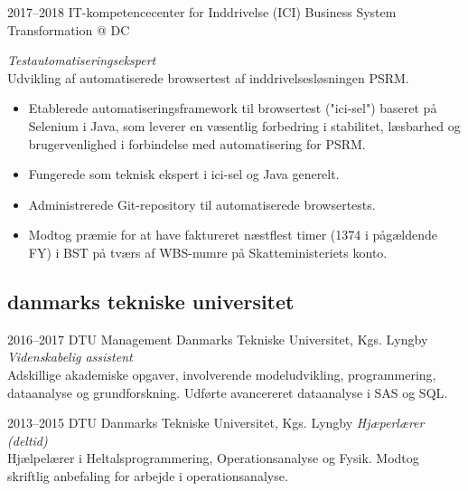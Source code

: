 \documentclass[]{../friggeri-cv} %
\begin{document}
\begin{entrylist}
\entry
{2017--2018}
{IT-kompetencecenter for Inddrivelse (ICI)}
{Business System Transformation @ DC}
{\emph{Testautomatiseringsekspert}\\
Udvikling af automatiserede browsertest af inddrivelsesløsningen PSRM. 
\begin{itemize}
\item Etablerede automatiseringsframework til browsertest ("ici-sel") baseret på Selenium i Java, som leverer en væsentlig forbedring i stabilitet, læsbarhed og brugervenlighed i forbindelse med automatisering for PSRM. 
\item Fungerede som teknisk ekspert i ici-sel og Java generelt. 
\item Administrerede Git-repository til automatiserede browsertests. 
\item Modtog præmie for at have faktureret næstflest timer (1374 i pågældende FY) i BST på tværs af WBS-numre på Skatteministeriets konto.
\end{itemize}
}

\end{entrylist}

\subsection{danmarks tekniske universitet}

\begin{entrylist}


\entry
{2016--2017}
{DTU Management}
{Danmarks Tekniske Universitet, Kgs. Lyngby}
{\emph{Videnskabelig assistent}\\
Adskillige akademiske opgaver, involverende modeludvikling, programmering, dataanalyse og grundforskning. Udførte avancereret dataanalyse i SAS og SQL.}

\entry
{2013--2015}
{DTU}
{Danmarks Tekniske Universitet, Kgs. Lyngby}
{\emph{Hjæperlærer (deltid)}\\
Hjælpelærer i Heltalsprogrammering, Operationsanalyse og Fysik. Modtog skriftlig anbefaling for arbejde i operationsanalyse.}

\end{entrylist}
\end{document}

